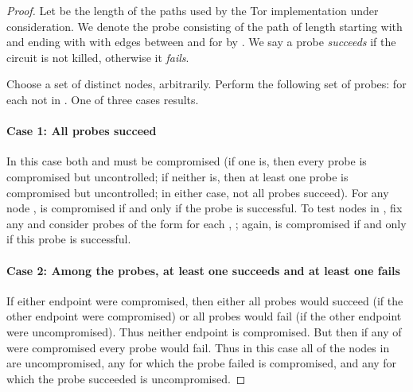 \documentclass[]{lmcs}
\begin{document}
\begin{proof}
Let  be the length of the paths used by the Tor implementation under
consideration. 
We denote the probe consisting of the path
of length  starting with  and ending with  with edges between
 and  for  by .
We say a probe {\em succeeds} if the circuit is not killed, otherwise it
{\em fails}. 

Choose a set  of  distinct nodes, 
arbitrarily.  Perform the following set of probes:
 for each  not in .
One of three cases results.

\paragraph*{Case 1: All  probes succeed}
In this case both  and  must be
compromised (if one is, then every probe is compromised but uncontrolled;
if neither is, then at least one probe is compromised but uncontrolled; in
either case, not all probes succeed).
For any node ,  is compromised if and only if
the probe  is successful.
To test nodes in , 
fix any  and consider
probes of the form  for
each , ; again,  is compromised if and only
if this probe is successful.

\paragraph*{Case 2: Among the  probes, at least one succeeds and at 
least one fails}
If either endpoint were compromised, then either all probes would succeed
(if the other endpoint were compromised) or all probes would fail
(if the other endpoint were uncompromised).  Thus neither endpoint is
compromised.  But then if any of  were compromised
every probe would fail.  Thus
in this case all of the nodes in  are uncompromised, any  for which
the probe failed is compromised, and any  for which the probe succeeded
is uncompromised.


\end{proof}
\end{document}
